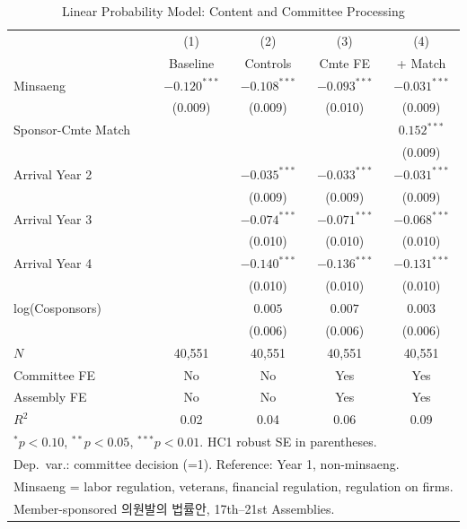 \documentclass[11pt]{article}
\begin{document}
\begin{table}[htbp]
\centering
\caption{Linear Probability Model: Content and Committee Processing}
\label{tab:main}
\begin{tabular}{lcccc}
\toprule
 & (1) & (2) & (3) & (4) \\
 & Baseline & Controls & Cmte FE & + Match \\
\midrule
Minsaeng & $-0.120^{***}$ & $-0.108^{***}$ & $-0.093^{***}$ & $-0.031^{***}$ \\
         & (0.009) & (0.009) & (0.010) & (0.009) \\[4pt]
Sponsor-Cmte Match & & & & $0.152^{***}$ \\
                   & & & & (0.009) \\[4pt]
Arrival Year 2 & & $-0.035^{***}$ & $-0.033^{***}$ & $-0.031^{***}$ \\
               & & (0.009) & (0.009) & (0.009) \\[4pt]
Arrival Year 3 & & $-0.074^{***}$ & $-0.071^{***}$ & $-0.068^{***}$ \\
               & & (0.010) & (0.010) & (0.010) \\[4pt]
Arrival Year 4 & & $-0.140^{***}$ & $-0.136^{***}$ & $-0.131^{***}$ \\
               & & (0.010) & (0.010) & (0.010) \\[4pt]
log(Cosponsors) & & $0.005$ & $0.007$ & $0.003$ \\
                & & (0.006) & (0.006) & (0.006) \\
\midrule
$N$ & 40,551 & 40,551 & 40,551 & 40,551 \\
Committee FE & No & No & Yes & Yes \\
Assembly FE & No & No & Yes & Yes \\
$R^2$ & 0.02 & 0.04 & 0.06 & 0.09 \\
\bottomrule
\multicolumn{5}{l}{\footnotesize $^{*}p<0.10$, $^{**}p<0.05$, $^{***}p<0.01$. HC1 robust SE in parentheses.} \\
\multicolumn{5}{l}{\footnotesize Dep.\ var.: committee decision (=1). Reference: Year 1, non-minsaeng.} \\
\multicolumn{5}{l}{\footnotesize Minsaeng = labor regulation, veterans, financial regulation, regulation on firms.} \\
\multicolumn{5}{l}{\footnotesize Member-sponsored 의원발의 법률안, 17th--21st Assemblies.} \\
\end{tabular}
\end{table}
\end{document}
